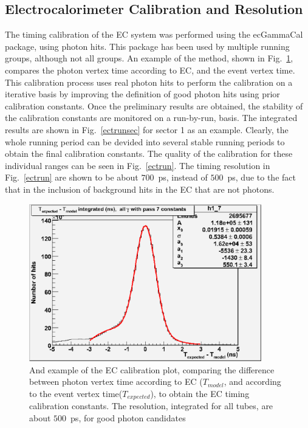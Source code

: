 \subsection{\label{sec:calib.ec}Electrocalorimeter Calibration and Resolution}
The timing calibration of the EC system was performed using the ecGammaCal package, using photon hits. This package has been used by multiple running groups, although not all groups. An example of the method, shown in Fig.~\ref{ectall}, compares the photon vertex time according to EC, and the event vertex time. This calibration process uses real photon hits to perform the calibration on a iterative basis by improving the definition of good photon hits using prior calibration constants. Once the preliminary results are obtained, the stability of the calibration constants are monitored on a run-by-run, basis. The integrated results are  shown in Fig.~\ref{ectrunsec} for sector 1 as an example. Clearly, the whole running period can be devided into several stable running periods to obtain the final calibration constants. The quality of the calibration for these individual ranges can be seen in Fig.~\ref{ectrun}. The timing resolution in Fig.~\ref{ectrun} are shown to be about $700$~ps, instead of $500$~ps, due to the fact that in the inclusion of background hits in the EC that are not photons.

\begin{figure}[h]
\begin{center}
 \includegraphics[width=0.9\textwidth]{figures/calib/ec/ec_vtimeall.eps}
  \caption{And example of the EC calibration plot, comparing  the difference between photon vertex time according to EC ($T_{model}$, and according to the event vertex time($T_{expected}$), to obtain the EC timing calibration constants. The resolution, integrated for all tubes, are about $500$~ps, for good photon candidates}
  \label{ectall}
  \end{center}
\end{figure}


